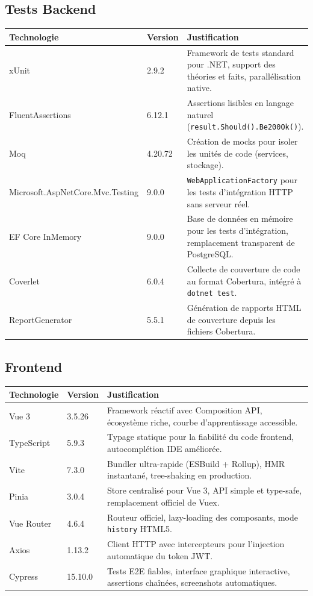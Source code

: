 \documentclass[12pt,a4paper]{article}
\begin{document}
\subsection{Tests Backend}

\begin{longtable}{p{5.5cm} p{2cm} p{7cm}}
\toprule
\textbf{Technologie} & \textbf{Version} & \textbf{Justification} \\
\midrule
\endhead
xUnit & 2.9.2 & Framework de tests standard pour .NET, support des th\'eories et faits, parall\'elisation native. \\
FluentAssertions & 6.12.1 & Assertions lisibles en langage naturel (\texttt{result.Should().Be200Ok()}). \\
Moq & 4.20.72 & Cr\'eation de mocks pour isoler les unit\'es de code (services, stockage). \\
Microsoft.AspNetCore.Mvc.Testing & 9.0.0 & \texttt{WebApplicationFactory} pour les tests d'int\'egration HTTP sans serveur r\'eel. \\
EF Core InMemory & 9.0.0 & Base de donn\'ees en m\'emoire pour les tests d'int\'egration, remplacement transparent de PostgreSQL. \\
Coverlet & 6.0.4 & Collecte de couverture de code au format Cobertura, int\'egr\'e \`a \texttt{dotnet test}. \\
ReportGenerator & 5.5.1 & G\'en\'eration de rapports HTML de couverture depuis les fichiers Cobertura. \\
\bottomrule
\end{longtable}

\subsection{Frontend}

\begin{longtable}{p{5.5cm} p{2cm} p{7cm}}
\toprule
\textbf{Technologie} & \textbf{Version} & \textbf{Justification} \\
\midrule
\endhead
Vue 3 & 3.5.26 & Framework r\'eactif avec Composition API, \'ecosyst\`eme riche, courbe d'apprentissage accessible. \\
TypeScript & 5.9.3 & Typage statique pour la fiabilit\'e du code frontend, autocompl\'etion IDE am\'elior\'ee. \\
Vite & 7.3.0 & Bundler ultra-rapide (ESBuild + Rollup), HMR instantan\'e, tree-shaking en production. \\
Pinia & 3.0.4 & Store centralis\'e pour Vue 3, API simple et type-safe, remplacement officiel de Vuex. \\
Vue Router & 4.6.4 & Routeur officiel, lazy-loading des composants, mode \texttt{history} HTML5. \\
Axios & 1.13.2 & Client HTTP avec intercepteurs pour l'injection automatique du token JWT. \\
Cypress & 15.10.0 & Tests E2E fiables, interface graphique interactive, assertions cha\^in\'ees, screenshots automatiques. \\
\bottomrule
\end{longtable}
\end{document}
